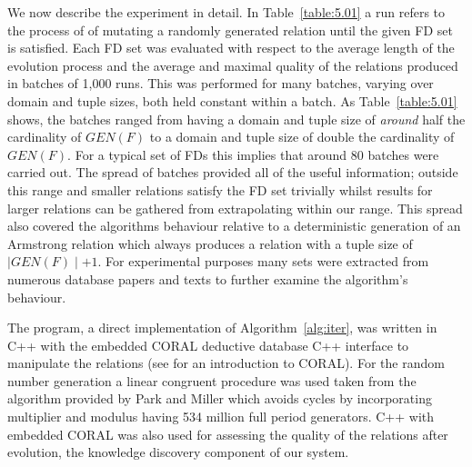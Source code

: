 We now describe the experiment in detail. In Table~\ref{table:5.01} a
run refers to the process of  of mutating
a randomly generated relation until the given FD set is satisfied.
 Each FD set was evaluated with respect to the average length of the
 evolution process and the average and maximal quality of the relations
 produced in batches of 1,000 runs.
This was performed for many batches, varying over domain and tuple
sizes, both held constant within a batch. As Table~\ref{table:5.01} 
shows, the batches ranged from having a domain and tuple size
of {\em around} half the cardinality of $GEN(F)$ to
a domain and tuple size of double the cardinality of $GEN(F)$.
  For a typical set of FDs this implies that around 80 batches
 were carried out. The spread of batches provided all of the useful
information; outside this range and smaller relations satisfy the
FD set trivially whilst results for larger relations can be gathered
from extrapolating within our range. This spread also covered the
algorithms behaviour relative to a deterministic generation
of an Armstrong relation which always produces a relation with
a tuple size of $\mid GEN(F) \mid + 1$.
For experimental purposes many sets
were extracted from numerous database papers and texts to further
examine the algorithm's behaviour.

\medskip


The program, a direct implementation of Algorithm~\ref{alg:iter},
 was written in C++ with the embedded CORAL deductive
database C++ interface to manipulate the relations (see
\cite{rss92} for an introduction to CORAL).  For the random
number generation a linear congruent procedure was used taken
from the algorithm provided by Park and Miller \cite{pm88} which
avoids cycles by incorporating multiplier and modulus
having 534 million full period generators. C++ with
embedded CORAL was also used for assessing the quality of
the relations after evolution, the knowledge discovery component
of our system.

\medskip

